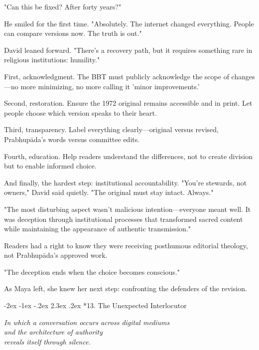 \documentclass[12pt,twoside]{book}
\makeatletter
\renewcommand\section{\@startsection{section}{1}{\z@}%
{-3.5ex \@plus -1ex \@minus -.2ex}%
{2.3ex \@plus.2ex}%
{\normalfont\Large\bfseries}}
\let\oldsection\section
\renewcommand{\section}[1]{\needspace{4\baselineskip}\oldsection{#1}}
\def\cleardoublepage{\clearpage\if@twoside \ifodd\c@page\else\hbox{}\thispagestyle{empty}\newpage\if@twocolumn\hbox{}\newpage\fi\fi\fi}
\renewcommand\section{\@startsection{section}{1}{\z@}%
{-2ex \@plus -1ex \@minus -.2ex}%
{2.3ex \@plus.2ex}%
{\normalfont\Large\bfseries}}
\makeatother
\begin{document}
"Can this be fixed? After forty years?"

He smiled for the first time. "Absolutely. The internet changed everything. People can compare versions now. The truth is out."

David leaned forward. "There's a recovery path, but it requires something rare in religious institutions: humility."

First, acknowledgment. The BBT must publicly acknowledge the scope of changes—no more minimizing, no more calling it 'minor improvements.'

Second, restoration. Ensure the 1972 original remains accessible and in print. Let people choose which version speaks to their heart.

Third, transparency. Label everything clearly—original versus revised, Prabhupāda's words versus committee edits.

Fourth, education. Help readers understand the differences, not to create division but to enable informed choice.

And finally, the hardest step: institutional accountability. "You're stewards, not owners," David said quietly. "The original must stay intact. Always."

"The most disturbing aspect wasn't malicious intention—everyone meant well. It was deception through institutional processes that transformed sacred content while maintaining the appearance of authentic transmission."

Readers had a right to know they were receiving posthumous editorial theology, not Prabhupāda's approved work.

"The deception ends when the choice becomes conscious."

As Maya left, she knew her next step: confronting the defenders of the revision.

\cleardoublepage
\vspace*{0.20\textheight}
\section*{13. The Unexpected Interlocutor}
\thispagestyle{chapterpage}

{\centering\itshape In which a conversation occurs across digital mediums\\and the architecture of authority\\reveals itself through silence.\par}
\vspace{0.1cm}
\end{document}
